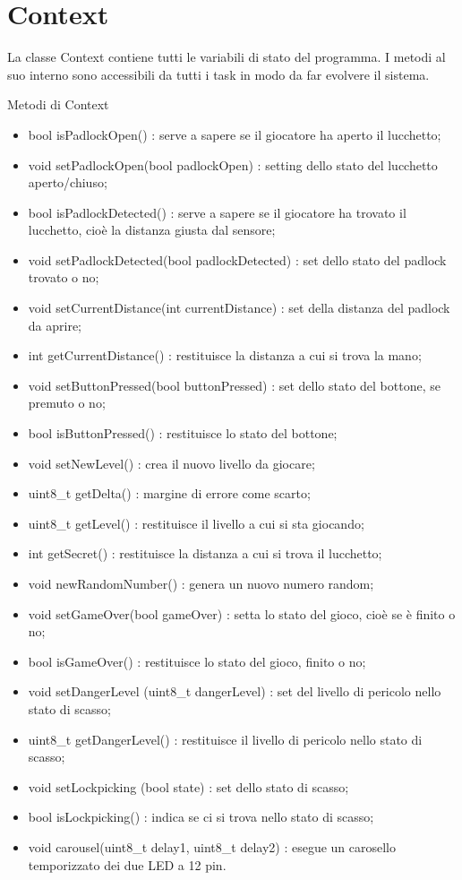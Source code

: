 \section{Context}\label{sec:context}
La classe Context contiene tutti le variabili di stato del programma. I metodi al suo interno sono accessibili da tutti i task in modo da far evolvere il sistema.

Metodi di Context
\begin{itemize}
	\item bool isPadlockOpen() : serve a sapere se il giocatore ha aperto il lucchetto;
	\item void setPadlockOpen(bool padlockOpen) : setting dello stato del lucchetto aperto/chiuso;
	\item bool isPadlockDetected() : serve a sapere se il giocatore ha trovato il lucchetto, cioè la distanza giusta dal sensore;
	\item void setPadlockDetected(bool padlockDetected) : set dello stato del padlock trovato o no;
	\item void setCurrentDistance(int currentDistance) : set della distanza del padlock da aprire;
	\item int getCurrentDistance() : restituisce la distanza a cui si trova la mano;
	\item void setButtonPressed(bool buttonPressed) : set dello stato del bottone, se premuto o no;
	\item bool isButtonPressed() : restituisce lo stato del bottone;
	\item void setNewLevel() : crea il nuovo livello da giocare;
	\item uint8\_t getDelta() : margine di errore come scarto;
	\item uint8\_t getLevel() : restituisce il livello a cui si sta giocando;
	\item int getSecret() : restituisce la distanza a cui si trova il lucchetto;
	\item void newRandomNumber() : genera un nuovo numero random;
	\item void setGameOver(bool gameOver) : setta lo stato del gioco, cioè se è finito o no;
	\item bool isGameOver() : restituisce lo stato del gioco, finito o no;
	\item void setDangerLevel (uint8\_t dangerLevel) :  set del livello di pericolo nello stato di scasso;
	\item uint8\_t getDangerLevel() : restituisce il livello di pericolo nello stato di scasso;
	\item void setLockpicking (bool state) : set dello stato di scasso;
	\item bool isLockpicking() : indica se ci si trova nello stato di scasso;
	\item void carousel(uint8\_t delay1, uint8\_t delay2) : esegue un carosello temporizzato dei due LED a 12 pin.
\end{itemize}



